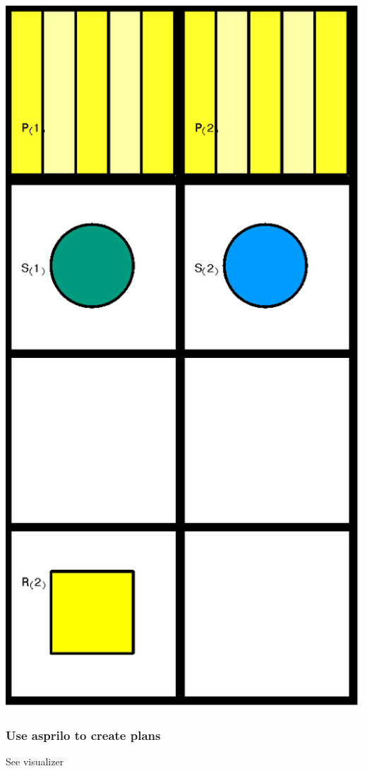 \documentclass{beamer}
\begin{document}
\begin{frame}
\includegraphics[scale=0.2]{x3y2r1s2p2_2.png}
\end{frame}

\begin{frame}
\frametitle{Use asprilo to create plans}
\centering
See visualizer
\end{frame}
\end{document}
